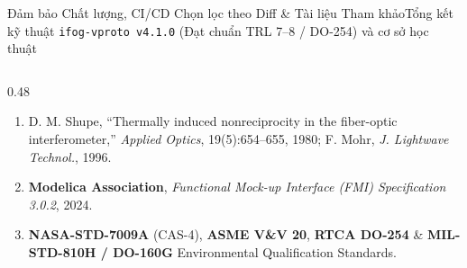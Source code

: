 \documentclass[aspectratio=169,8pt]{beamer}
\newcommand{\DocVersion}{v4.1.0}
\begin{document}
\begin{frame}{Đảm bảo Chất lượng, CI/CD Chọn lọc theo Diff \& Tài liệu Tham khảo}{Tổng kết kỹ thuật \texttt{ifog-vproto \DocVersion} (Đạt chuẩn TRL 7--8 / DO-254) và cơ sở học thuật}
\begin{columns}[T]
\begin{column}{0.48\textwidth}
\begin{remarkbox}
\begin{enumerate}
        \item D. M. Shupe, ``Thermally induced nonreciprocity in the fiber-optic interferometer,'' \emph{Applied Optics}, 19(5):654--655, 1980; F. Mohr, \emph{J. Lightwave Technol.}, 1996.
        \item \textbf{Modelica Association}, \emph{Functional Mock-up Interface (FMI) Specification 3.0.2}, 2024.
        \item \textbf{NASA-STD-7009A} (CAS-4), \textbf{ASME V\&V 20}, \textbf{RTCA DO-254} \& \textbf{MIL-STD-810H / DO-160G} Environmental Qualification Standards.
      \end{enumerate}
    \end{remarkbox}
  \end{column}
\end{columns}
\end{frame}
\end{document}
